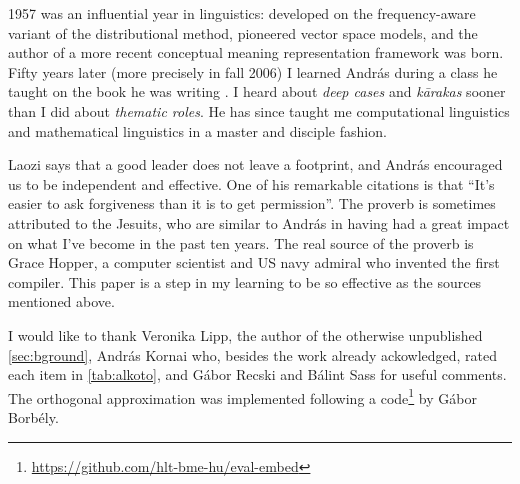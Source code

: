 \documentclass[11pt]{article}
\begin{document}
1957 was an influential year in linguistics: \cite{Harris:1957} developed on the
frequency-aware variant of the distributional method, \cite{Osgood:1957}
pioneered vector space models, and the author of a more recent conceptual
meaning representation framework \citep{Kornai:2010,Kornai:2017} was born.
Fifty years later (more precisely in fall 2006) I learned András during a class
he taught on the book he was writing \citep{Kornai:2007}. I heard about
\emph{deep cases} and \emph{k\={a}rakas} sooner than I did about \emph{thematic
roles}. He has since taught me computational linguistics and mathematical
linguistics in a master and disciple fashion.

Laozi says that a good leader does not leave a footprint, and András encouraged
us to be independent and effective. One of his remarkable citations is that
``It's easier to ask forgiveness than it is to get permission''. The proverb is
sometimes attributed to the Jesuits, who are similar to András in having had a
great impact on what I've become in the past ten years. The real source of the
proverb is Grace Hopper, a computer scientist and US navy admiral who invented
the first compiler.
This paper is a step in my learning to be so effective as the sources
mentioned above.

\bigskip

I would like to thank Veronika Lipp, the author of the otherwise unpublished
\cref{sec:bground}, András Kornai who, besides the work already ackowledged,
rated each item in \cref{tab:alkoto}, and Gábor Recski and Bálint Sass  for
useful comments. The orthogonal approximation was implemented following a
code\footnote{\url{https://github.com/hlt-bme-hu/eval-embed}} by Gábor Borbély.


 
\end{document}
